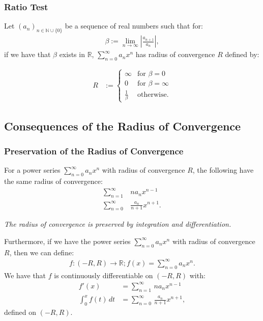 \documentclass[a4paper, 12pt, twoside]{article}
\begin{document}
\subsubsection{Ratio Test}

Let $(a_n)_{n\in\mathbb{N}\cup\{0\}}$ be a sequence of real numbers such that for:
\begin{align*}
      \beta := \lim_{n\to\infty}\left|\frac{a_{n + 1}}{a_n}\right|,
\end{align*}
if we have that $\beta$ exists in $\mathbb{R}$, $\sum_{n = 0}^\infty a_nx^n$
has radius of convergence $R$ defined by:

\begin{align*}
      R & := \begin{cases}
            \infty           & \text{for } \beta = 0      \\
            0                & \text{for } \beta = \infty \\
            \frac{1}{\beta} & \text{otherwise}.
      \end{cases}
\end{align*}

\subsection{Consequences of the Radius of Convergence}

\subsubsection{Preservation of the Radius of Convergence}

For a power series $\sum_{n = 0}^\infty a_nx^n$ with radius of convergence $R$,
the following have the same radius of convergence:
\begin{align*}
      \sum_{n = 1}^\infty & \, na_nx^{n-1} \\
      \sum_{n = 0}^\infty & \, \frac{a_n}{n + 1}x^{n + 1}.
\end{align*}

\textit{The radius of convergence is preserved by integration and
differentiation.}

Furthermore, if we have the power series $\sum_{n = 0}^\infty a_nx^n$ with 
radius of convergence $R$, then we can define:
\begin{align*}
      f : (-R, R) \to \mathbb{R}; f(x) = \sum_{n = 0}^\infty a_nx^n.
\end{align*}
We have that $f$ is continuously differentiable on $(-R, R)$ with:
\begin{align*}
      f'(x) &= \sum_{n = 1}^\infty \, na_nx^{n-1} \\
      \int_0^x f(t) \, dt &= \sum_{n = 0}^\infty \, \frac{a_n}{n + 1}x^{n + 1},
\end{align*}
defined on $(-R, R)$.
\end{document}
